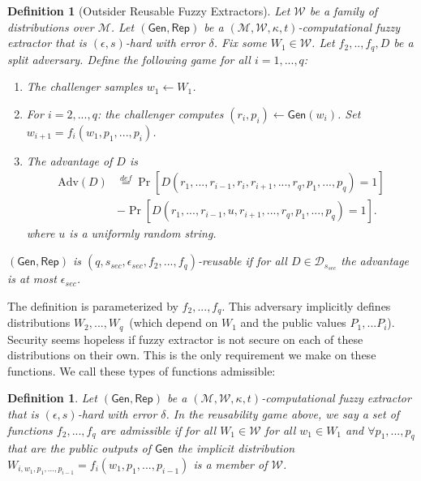 \documentclass[11pt]{article}
\newcommand{\class}[1]{{\ensuremath{\mathsf{#1}}}}
\newcommand{\gen}{\ensuremath{\class{Gen}}\xspace}
\newcommand{\rep}{\ensuremath{\class{Rep}}\xspace}
\newtheorem{definition}[theorem]{Definition}
\begin{document}
\begin{definition}[Outsider Reusable Fuzzy Extractors]
\label{def:outsider fuzz ext}
Let $\mathcal{W}$ be a family of distributions over $\mathcal{M}$.  Let $(\gen, \rep)$ be a $(\mathcal{M}, \mathcal{W}, \kappa, t)$-computational fuzzy extractor that is $(\epsilon, s)$-hard with error $\delta$.
Fix some $W_1 \in \mathcal{W}$.  Let $f_2,.., f_q , D$ be a split adversary.  Define the following game for all $i=1,..., q$:
\begin{enumerate}%
\item[Sampling] The challenger samples $w_1\leftarrow W_1$.
\item[Perturbation] For $i=2,..., q$: the challenger computes $(r_i, p_i)\leftarrow \gen(w_i)$.  Set $w_{i+1} = f_i(w_1, p_1,..., p_i)$.%
\item[Distinguishing] The advantage of $D$ is
\begin{align*}
\text{Adv}(D)&\overset{def}= \Pr[D(r_1,..., r_{i-1}, r_i, r_{i+1},..., r_q, p_1,..., p_q)=1]\\ &- \Pr[D(r_1,..., r_{i-1}, u, r_{i+1},..., r_q, p_1,..., p_q)=1].
\end{align*}
where $u$ is a uniformly random string.
\end{enumerate}
$(\gen, \rep)$ is $(q, s_{sec}, \epsilon_{sec}, f_2,..., f_q)$-reusable if for all $D\in\mathcal{D}_{s_{sec}}$ the advantage is at most $\epsilon_{sec}$.
\end{definition}

The definition is parameterized by $f_2,..., f_q$.  This adversary implicitly defines distributions $W_2,..., W_q$~(which depend on $W_1$ and the public values $P_1,... P_i$).  Security seems hopeless if fuzzy extractor is not secure on each of these distributions on their own.  This is the only requirement we make on these functions.  We call these types of functions admissible:

\begin{definition}
Let $(\gen, \rep)$ be a $(\mathcal{M}, \mathcal{W}, \kappa, t)$-computational fuzzy extractor that is $(\epsilon, s)$-hard with error $\delta$.  In the reusability game above, we say a set of functions $f_2,..., f_q$ are \emph{admissible} if for all $W_1\in \mathcal{W}$ for all $w_1\in W_1$ and $\forall p_1,..., p_q$ that are the public outputs of $\gen$ the implicit distribution $W_{i,w_1,p_1,..., p_{i-1}} = f_i(w_1,p_1,..., p_{i-1})$ is a member of $\mathcal{W}$.   
\end{definition}
\end{document}
